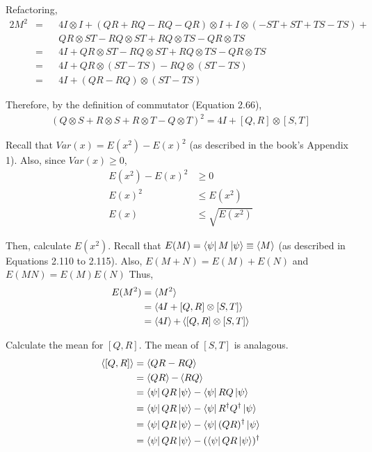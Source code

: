Refactoring,
%
\begin{alignat}{2}
    M^2 &= 
    &&4I \otimes I + (QR + RQ - RQ - QR) \otimes I +
    I \otimes (-ST + ST + TS - TS) +
    \nonumber \\
    & &&QR \otimes ST - RQ \otimes ST +
    RQ \otimes TS - QR \otimes TS
    \\
    &= && 4I + QR \otimes ST - RQ \otimes ST + RQ \otimes TS - QR \otimes TS
    \\
    &= && 4I + QR \otimes (ST - TS) - RQ \otimes (ST - TS)
    \\
    &= && 4I + (QR - RQ) \otimes (ST - TS)
\end{alignat}

Therefore, by the definition of commutator (Equation 2.66),
%
\begin{align}
    (Q \otimes S + R \otimes S + R \otimes T - Q \otimes T)^2 =
    4I + [Q, R] \otimes [S, T]
\end{align}

Recall that $Var(x) = E(x^2) - E(x)^2$ 
(as described in the book's Appendix 1).
Also, since $Var(x) \geq 0$,
\begin{align}
    E(x^2) - E(x)^2 &\geq 0 \\
    E(x)^2 &\leq E(x^2) \\
    E(x) &\leq \sqrt{E(x^2)}
\end{align}

Then, calculate $E(x^2)$.
Recall that $E(M) = \bra{\psi} M \ket{\psi} \equiv \mathop{\mathinner{ \langle {M} \rangle}}$
(as described in Equations 2.110 to 2.115).
Also, $E(M + N) = E(M) + E(N)$ and $E(MN) = E(M) E(N)$
Thus, 
\begin{align}
    E(M^2) &= \mathop{\mathinner{ \langle {M^2} \rangle}} \\
    &= \mathop{\mathinner{ \langle {4I + [Q, R] \otimes [S, T]} \rangle}} \\
    &= \mathop{\mathinner{ \langle {4I} \rangle}} + \mathop{\mathinner{ \langle {[Q, R] \otimes [S, T]} \rangle}}
\end{align}

Calculate the mean for $[Q, R]$. The mean of $[S, T]$ is analagous.
\begin{align}
    \mathop{\mathinner{ \langle {[Q, R]} \rangle}} &= \mathop{\mathinner{ \langle {QR - RQ} \rangle}} \\
    &= \mathop{\mathinner{ \langle {QR} \rangle}} - \mathop{\mathinner{ \langle {RQ} \rangle}} \\
    &= \bra{\psi}QR\ket{\psi} - \bra{\psi}RQ\ket{\psi} \\
    &= \bra{\psi}QR\ket{\psi} - \bra{\psi}R^\dagger Q^\dagger \ket{\psi} \\
    &= \bra{\psi}QR\ket{\psi} - \bra{\psi}(QR)^\dagger \ket{\psi} \\
    &= \bra{\psi}QR\ket{\psi} - (\bra{\psi} QR \ket{\psi})^\dagger
\end{align}

